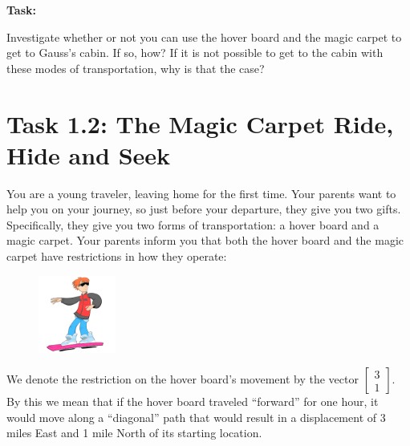 \documentclass[14pt]{problemset}
\newcommand{\mat}[1]{\begin{bmatrix}#1\end{bmatrix}}
\begin{document}
\vspace{5mm}

\textbf{Task:}
\par
Investigate whether or not you can use the hover board and the magic
carpet to get to Gauss's cabin. If so, how? If it is not possible to
get to the cabin with these modes of transportation, why is that the case?


\newpage
\section*{Task 1.2: The Magic Carpet Ride, Hide and Seek}


You are a young traveler, leaving home for the first time. Your parents
want to help you on your journey, so just before your departure, they give
you two gifts. Specifically, they give you two forms of transportation:
a hover board and a magic carpet. Your parents inform you that both the
hover board and the magic carpet have restrictions in how they operate:



\begin{minipage}{\textwidth}
	\vspace{.5cm}
	\begin{figure}
	\vspace{-.8cm}
	\includegraphics[width=1in]{images/HoverBoard-small.png}
	\end{figure}

	We denote the restriction on the hover board's movement by the vector
	$\mat{3 \\1}$. By this we mean that if
	the hover board traveled ``forward'' for one hour, it would move along a
	``diagonal'' path that would result in a displacement of 3 miles East and
	1 mile North of its starting location.
\end{minipage}
\end{document}
